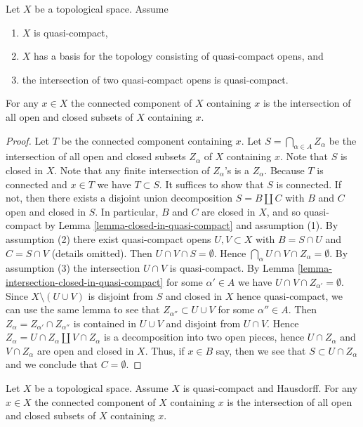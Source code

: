 \begin{lemma}
\label{lemma-connected-component-intersection}
Let $X$ be a topological space.
Assume
\begin{enumerate}
\item $X$ is quasi-compact,
\item $X$ has a basis for the topology consisting of quasi-compact opens, and
\item the intersection of two quasi-compact opens is quasi-compact.
\end{enumerate}
For any $x \in X$ the connected component of $X$ containing
$x$ is the intersection of all open and closed subsets
of $X$ containing $x$.
\end{lemma}

\begin{proof}
Let $T$ be the connected component containing $x$.
Let $S = \bigcap_{\alpha \in A} Z_\alpha$ be the intersection of all
open and closed subsets $Z_\alpha$ of $X$ containing $x$.
Note that $S$ is closed in $X$.
Note that any finite intersection of $Z_\alpha$'s is a $Z_\alpha$.
Because $T$ is connected and $x \in T$ we have $T \subset S$.
It suffices to show that $S$ is connected.
If not, then there exists a disjoint union decomposition
$S = B \amalg C$ with $B$ and $C$ open and closed in $S$.
In particular, $B$ and $C$ are closed in $X$, and so quasi-compact by
Lemma \ref{lemma-closed-in-quasi-compact} and assumption (1).
By assumption (2) there exist quasi-compact opens
$U, V \subset X$ with $B = S \cap U$ and $C = S \cap V$ (details omitted).
Then $U \cap V \cap S = \emptyset$.
Hence $\bigcap_\alpha U \cap V \cap Z_\alpha = \emptyset$.
By assumption (3) the intersection $U \cap V$ is quasi-compact.
By Lemma \ref{lemma-intersection-closed-in-quasi-compact}
for some $\alpha' \in A$ we have $U \cap V \cap Z_{\alpha'} = \emptyset$.
Since $X \setminus (U \cup V)$ is disjoint from $S$
and closed in $X$ hence quasi-compact, we can use the same lemma
to see that $Z_{\alpha''} \subset U \cup V$ for some $\alpha'' \in A$.
Then $Z_\alpha = Z_{\alpha'} \cap Z_{\alpha''}$ is contained
in $U \cup V$ and disjoint from $U \cap V$.
Hence $Z_\alpha = U \cap Z_\alpha \amalg V \cap Z_\alpha$
is a decomposition into two open pieces,
hence $U \cap Z_\alpha$ and $V \cap Z_\alpha$ are open and closed in $X$.
Thus, if $x \in B$ say, then we see that $S \subset U \cap Z_\alpha$
and we conclude that $C = \emptyset$.
\end{proof}

\begin{lemma}
\label{lemma-connected-component-intersection-compact-Hausdorff}
Let $X$ be a topological space. Assume $X$ is quasi-compact and Hausdorff.
For any $x \in X$ the connected component of $X$ containing
$x$ is the intersection of all open and closed subsets
of $X$ containing $x$.
\end{lemma}

